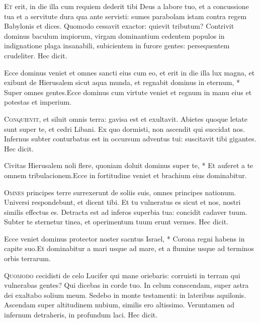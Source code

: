 \begin{multicols*}{2}
\lettrine[lines=2]{\zallmancaps \color{Blue} E}{t} erit, in die illa cum requiem dederit tibi Deus a labore tuo, et a concussione tua et a servitute dura qua ante servisti: sumes parabolam istam contra regem Babylonis et dices. Quomodo cessavit exactor: quievit tributum? Contrivit dominus baculum impiorum, virgam dominantium cedentem populos in indignatione plaga insanabili, subicientem in furore gentes: persequentem crudeliter. Hec dicit.
\begin{responsory}
{Ecce dominus veniet et omnes sancti eius cum eo, et erit in die illa lux magna, et exibunt de Hierusalem sicut aqua munda, et regnabit dominus in eternum, * Super omnes gentes.}{Ecce dominus cum virtute veniet et regnum in manu eius et potestas et imperium.}
\end{responsory}
\lettrine[lines=2]{\zallmancaps \color{Red} C}{onquievit}, et siluit omnis terra: gavisa est et exultavit. Abietes quoque letate sunt super te, et cedri Libani. Ex quo dormisti, non ascendit qui succidat nos. Infernus subter conturbatus est in occursum adventus tui: suscitavit tibi gigantes. Hec dicit.
\begin{responsory-doxology}
{Civitas Hierusalem noli flere, quoniam doluit dominus super te, * Et auferet a te omnem tribulacionem.}{Ecce in fortitudine veniet et brachium eius dominabitur.}
\end{responsory-doxology}
\lettrine[lines=2]{\zallmancaps \color{Blue} O}{mnes} principes terre surrexerunt de soliis suis, omnes principes nationum. Universi respondebunt, et dicent tibi. Et tu vulneratus es sicut et nos, nostri similis effectus es. Detracta est ad inferos superbia tua: concidit cadaver tuum. Subter te sternetur tinea, et operimentum tuum erunt vermes. Hec dicit.
\begin{responsory}
{Ecce veniet dominus protector noster sacntus Israel, * Corona regni habens in capite suo.}{Et dominabitur a mari usque ad mare, et a flumine usque ad terminos orbis terrarum.}
\end{responsory}
\lettrine[lines=2]{\zallmancaps \color{Red} Q}{uomodo} cecidisti de celo Lucifer qui mane oriebaris: corruisti in terram qui vulnerabas gentes? Qui dicebas in corde tuo. In celum conscendam, super astra dei exaltabo solium meum. Sedebo in monte testamenti: in lateribus aquilonis. Ascendam super altitudinem nubium, similis ero altissimo. Veruntamen ad infernum detraheris, in profundum laci. Hec dicit.

\end{multicols*}
